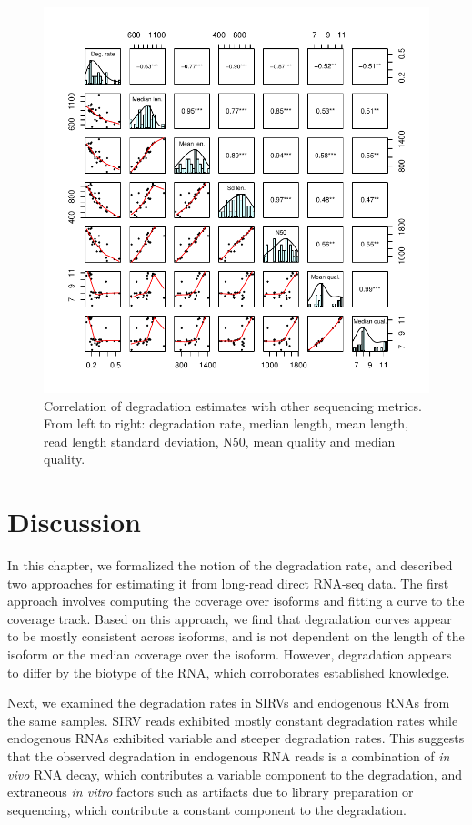 \begin{figure}[p]
    \centering
    \includegraphics[width=\textwidth]{figures/pwcor.pdf}
    \caption[Correlation of degradation estimates with other sequencing metrics]{Correlation of degradation estimates with other sequencing metrics. From left to right: degradation rate, median length, mean length, read length standard deviation, N50, mean quality and median quality.}
    \label{fig:pwcor}
\end{figure}

\section{Discussion}

In this chapter, we formalized the notion of the degradation rate, and described two approaches for estimating it from long-read direct RNA-seq data. The first approach involves computing the coverage over isoforms and fitting a curve to the coverage track. Based on this approach, we find that degradation curves appear to be mostly consistent across isoforms, and is not dependent on the length of the isoform or the median coverage over the isoform. However, degradation appears to differ by the biotype of the RNA, which corroborates established knowledge. 

Next, we examined the degradation rates in SIRVs and endogenous RNAs from the same samples. SIRV reads exhibited mostly constant degradation rates while endogenous RNAs exhibited variable and steeper degradation rates. This suggests that the observed degradation in endogenous RNA reads is a combination of \textit{in vivo} RNA decay, which contributes a variable component to the degradation, and extraneous \textit{in vitro} factors such as artifacts due to library preparation or sequencing, which contribute a constant component to the degradation. 

